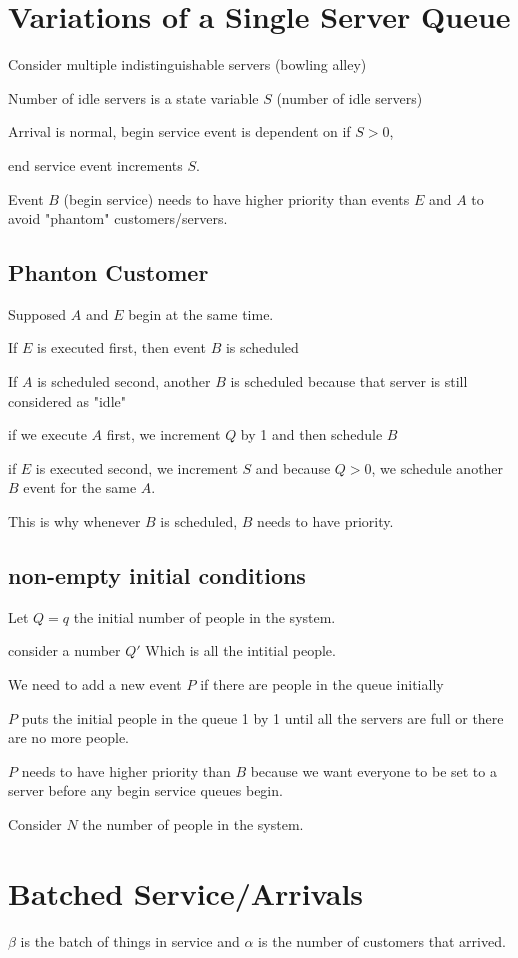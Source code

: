 \documentclass[fleqn]{report}
\begin{document}
\section{Variations of a Single Server Queue}
Consider multiple indistinguishable servers (bowling alley)

Number of idle servers is a state variable $S$ (number of idle servers)

Arrival is normal, begin service event is dependent on if $S > 0$,

end service event increments $S$.

Event $B$ (begin service) needs to have higher priority than events $E$ and $A$ 
to avoid "phantom" customers/servers. 

\subsection{Phanton Customer}
Supposed $A$ and $E$ begin at the same time.

If $E$ is executed first, then event $B$ is scheduled 

If $A$ is scheduled second, another $B$ is scheduled because that 
server is still considered as "idle"

if we execute $A$ first, we increment $Q$ by 1 and then schedule $B$ 

if $E$ is executed second, we increment $S$ and because $Q > 0$, we 
schedule another $B$ event for the same $A$.

This is why whenever $B$ is scheduled, $B$ needs to have priority.

\subsection{non-empty initial conditions}
Let $Q = q$ the initial number of people in the system.

consider a number $Q'$ Which is all the intitial people. 

We need to add a new event $P$ if there are people in the queue initially 

$P$ puts the initial people in the queue 1 by 1 until all the servers are 
full or there are no more people. 

$P$ needs to have higher priority than $B$ because we want everyone 
to be set to a server before any begin service queues begin. 

Consider $N$ the number of people in the system. 

\section{Batched Service/Arrivals}
$\beta$ is the batch of things in service and $\alpha$ is the number 
of customers that arrived. 
\end{document}
